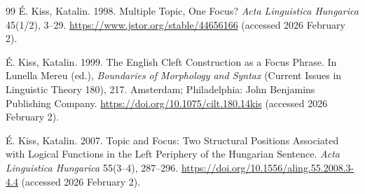 \documentclass[ruler]{CUP-JNL-LIN}%
\begin{document}
\begin{Backmatter}
\begin{thebibliography}{99}
{É. Kiss, Katalin}. 1998. Multiple Topic, One Focus? \textit{Acta Linguistica Hungarica} 45(1/2), 3--29. \url{https://www.jstor.org/stable/44656166} (accessed 2026 February 2).




{É. Kiss, Katalin}. 1999. The English Cleft Construction as a Focus Phrase. In Lunella Mereu (ed.), \textit{Boundaries of Morphology and Syntax} (Current Issues in Linguistic Theory 180), 217. Amsterdam; Philadelphia: John Benjamins Publishing Company. \url{https://doi.org/10.1075/cilt.180.14kis} (accessed 2026 February 2).




{É. Kiss, Katalin}. 2007. Topic and Focus: Two Structural Positions Associated with Logical Functions in the Left Periphery of the Hungarian Sentence. \textit{Acta Linguistica Hungarica} 55(3--4), 287--296. \url{https://doi.org/10.1556/aling.55.2008.3-4.4} (accessed 2026 February 2).




\end{thebibliography}
\end{Backmatter}
\end{document}
